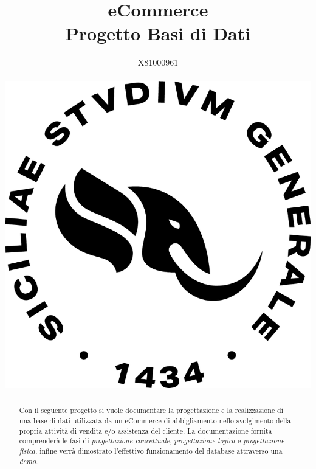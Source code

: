 \documentclass{article}
\title{eCommerce\\ \small{Progetto Basi di Dati}}
\date{}
\author{X81000961\\\\\includegraphics[scale=0.2]{images/unict-logo.png}}
\begin{document}
\maketitle

\begin{abstract}
Con il seguente progetto si vuole documentare la progettazione e la realizzazione di una base di dati utilizzata da un eCommerce di abbigliamento nello svolgimento della propria attività di vendita e/o assistenza del cliente. La documentazione fornita comprenderà le fasi di \textit{progettazione concettuale}, \textit{progettazione logica} e \textit{progettazione fisica}, infine verrà dimostrato l'effettivo funzionamento del database attraverso una \textit{demo}.
\end{abstract}
\newpage

\tableofcontents

\newpage



\end{document}
